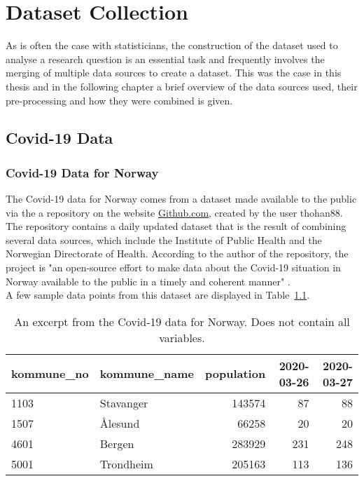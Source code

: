 %
\chapter{Dataset Collection}
As is often the case with statisticians, the construction of the dataset used to analyse a research question is an essential task and frequently involves the merging of multiple data sources to create a dataset. This was the case in this thesis and in the following chapter a brief overview of the data sources used, their pre-processing and how they were combined is given.
\label{sec:datacollection}
\clearpage
\section{Covid-19 Data}
\subsection{Covid-19 Data for Norway}
The Covid-19 data for Norway comes from a dataset made available to the public via the a repository on the website \href{https://www.github.com}{Github.com}, created by the user thohan88. The repository contains a daily updated dataset that is the result of combining several data sources, which include the Institute of Public Health and the Norwegian Directorate of Health. According to the author of the repository, the project is "an open-source effort to make data about the Covid-19 situation in Norway available to the public in a timely and coherent manner" \autocite[][]{thohan88}. \\
A few sample data points from this dataset are displayed in Table~\ref{datasetNorge}.\\
\begin{table}[H] 
\caption{An excerpt from the Covid-19 data for Norway. Does not contain all variables.\label{datasetNorge}}
\begin{tabular}{l l r r r}
\toprule
\textbf{kommune\_no}	& \textbf{kommune\_name}	& \textbf{population}	& \textbf{2020-03-26}	& \textbf{2020-03-27}\\
\midrule
1103 & Stavanger & 143574 & 87 & 88 \\
1507 & Ålesund & 66258 & 20 & 20 \\
4601 & Bergen & 283929 & 231 & 248 \\
5001 & Trondheim & 205163 & 113 & 136 \\
\bottomrule
\end{tabular}
\end{table}
